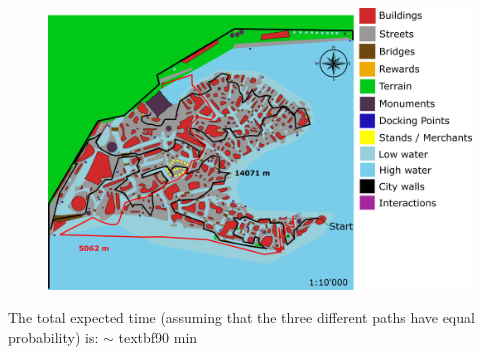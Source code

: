 \begin{itemize}
\begin{figure}[H]
    \centering
\includegraphics[scale=0.3]{Images/Diagrams/dynamiapath3.png}
\end{figure}
\end{itemize}


The total expected time (assuming that the three different paths have equal probability) is:  $\sim$ textbf{90 min}


